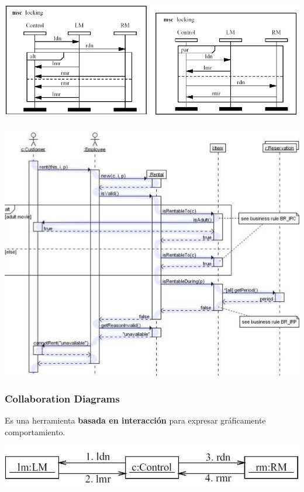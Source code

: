\documentclass[]{article}
\begin{document}
\begin{center}
	\includegraphics[scale=0.4]{AltCicPara.png}
\end{center}

\begin{center}
	\includegraphics[scale=0.4]{Barract.png}
\end{center}

\subsubsection{Collaboration Diagrams}
Es una herramienta \textbf{basada en interacción} para expresar gráficamente comportamiento.
\begin{center}
	\includegraphics[scale=0.4]{Collab.png}
\end{center}
\end{document}
